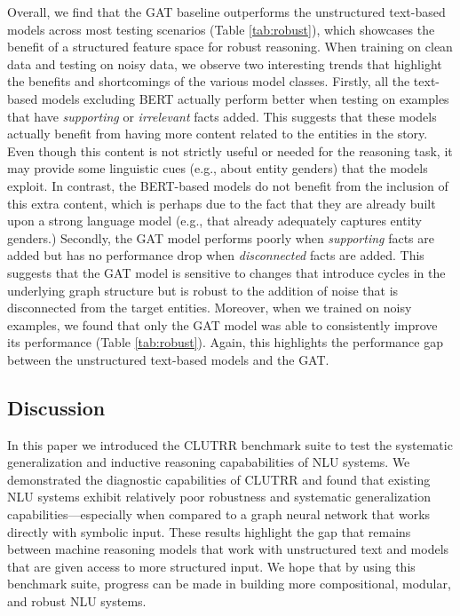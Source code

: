 \documentclass[12pt]{article}
\begin{document}


Overall, we find that the GAT baseline outperforms the unstructured text-based models across most testing scenarios (Table \ref{tab:robust}), which showcases the benefit of a structured feature space for robust reasoning.
When training on clean data and testing on noisy data, we observe two interesting trends that highlight the benefits and shortcomings of the various model classes. Firstly, all the text-based models excluding BERT actually perform better when testing on examples that have {\em supporting} or {\em irrelevant} facts added. This suggests that these models actually benefit from having more content related to the entities in the story. Even though this content is not strictly useful or needed for the reasoning task, it may provide some linguistic cues (e.g., about entity genders) that the models exploit. In contrast, the BERT-based models do not benefit from the inclusion of this extra content, which is perhaps due to the fact that they are already built upon a strong language model (e.g., that already adequately captures entity genders.)
Secondly, the GAT model performs poorly when {\em supporting} facts are added but has no performance drop when {\em disconnected} facts are added. This suggests that the GAT model is sensitive to changes that introduce cycles in the underlying graph structure but is robust to the addition of noise that is disconnected from the target entities.
Moreover, when we trained on noisy examples, we found that only the GAT model was able to consistently improve its performance (Table \ref{tab:robust}).
Again, this highlights the performance gap between the unstructured text-based models and the GAT.

\subsection{Discussion}

In this paper we introduced the CLUTRR benchmark suite to test the systematic generalization and inductive reasoning capababilities of NLU systems.
We demonstrated the diagnostic capabilities of CLUTRR and found that existing NLU systems exhibit relatively poor robustness and systematic generalization capabilities---especially when compared to a graph neural network that works directly with symbolic input.
These results highlight the gap that remains between machine reasoning models that work with unstructured text and models that are given access to more structured input.
We hope that by using this benchmark suite, progress can be made in building more compositional, modular, and robust NLU systems.
\end{document}
